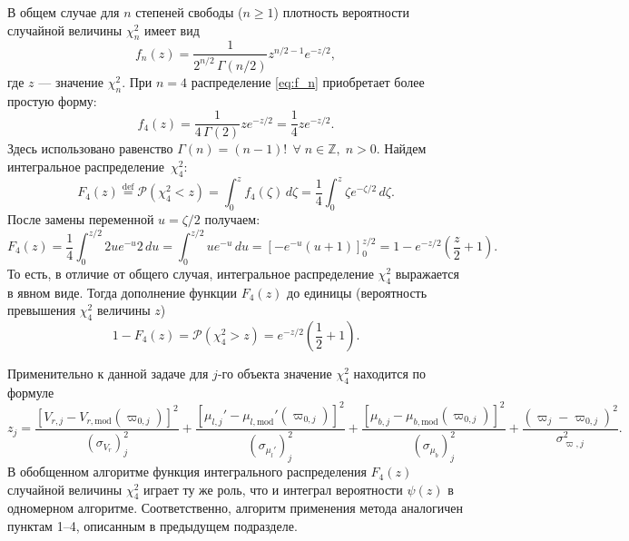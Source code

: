 \documentclass[a4paper, oneside, 14pt]{article}
\begin{document}
В общем случае для $ n $ степеней свободы ($ n \ge 1 $) плотность вероятности случайной величины $ \chi_n^2 $ имеет вид
%
\begin{equation}
  \label{eq:f_n}
  f_n(z) = \frac{1}{2^{n/2} \, \Gamma(n / 2)} z^{n / 2 - 1} e^{-z / 2},
\end{equation}
%
где $ z $ --- значение $ \chi_n^2 $. При $ n = 4 $ распределение \eqref{eq:f_n} приобретает более простую форму:
%
\begin{equation}
  f_4(z) = \frac{1}{4 \, \Gamma(2)} z e^{-z / 2} = \frac{1}{4} z e^{-z / 2}.
\end{equation}
%
Здесь использовано равенство $ \Gamma(n) = (n - 1)! \;\, \forall \; n \in \mathbb{Z}, \; n > 0 $. Найдем интегральное распределение~$ \chi_4^2 $:
%
\begin{equation}
  F_4(z) \stackrel{\text{def}}{=} \mathcal{P}(\chi_4^2 < z) = \int_0^z f_4(\zeta) \, d\zeta = \frac{1}{4} \int_0^z \zeta e^{-\zeta / 2} \, d\zeta.
\end{equation}
%
После замены переменной $ u = \zeta / 2 $ получаем:
%
\begin{equation}
  F_4(z) = \frac{1}{4} \int_0^{z / 2} 2 u e^{-u} 2 \, du = \int_0^{z / 2} u e^{-u} \, du = \left[ -e^{-u} (u + 1) \right]_0^{z / 2} = 1 - e^{-z / 2} \left( \frac{z}{2} + 1 \right).
\end{equation}
%
То есть, в отличие от общего случая, интегральное распределение $ \chi_4^2 $ выражается в явном виде. Тогда дополнение функции $ F_4(z) $ до единицы (вероятность превышения $ \chi_4^2 $ величины $ z $)
%
\begin{equation}
  1 - F_4(z) = \mathcal{P}(\chi_4^2 > z) = e^{-z / 2} \left( \frac{1}{2} + 1 \right).
\end{equation}

Применительно к данной задаче для $j$-го объекта значение $ \chi_4^2 $ находится по формуле
%
\begin{equation}
  z_j = \frac{[ V_{r,j} - V_{r,\text{mod}}(\varpi_{0,j}) ]^2}{(\sigma_{V_r})_j^2} + \frac{[ \mu_{l,j}' - \mu_{l,\text{mod}}'(\varpi_{0,j}) ]^2}{(\sigma_{\mu_l'})_j^2} + \frac{[ \mu_{b,j} - \mu_{b,\text{mod}}(\varpi_{0,j}) ]^2}{(\sigma_{\mu_b})_j^2} + \frac{( \varpi_j - \varpi_{0,j} )^2}{\sigma_{\varpi,j}^2}.
\end{equation}
%
В обобщенном алгоритме функция интегрального распределения $ F_4(z) $ случайной величины $ \chi_4^2 $ играет ту же роль, что и интеграл вероятности $ \psi(z) $ в одномерном алгоритме. Соответственно, алгоритм применения метода аналогичен пунктам 1--4, описанным в предыдущем подразделе.
\end{document}
